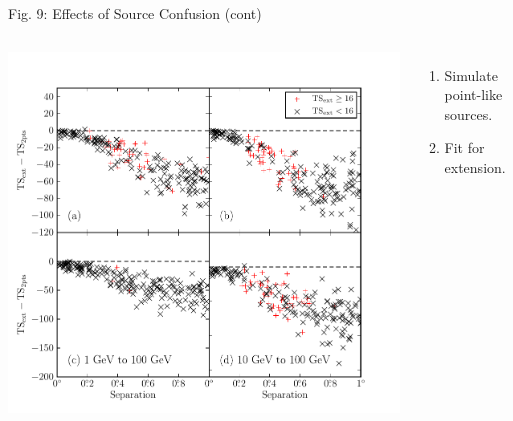 \documentclass[12pt]{beamer}
\begin{document}
\begin{frame}{Fig. 9: Effects of Source Confusion (cont)}

  \begin{columns}

    \includegraphics[scale=0.50]{plots/confusion_2pts_plot_color.pdf}
    \begin{enumerate}
      \item Simulate point-like sources. 
      \item Fit for extension.
    \end{enumerate}
  \end{columns}
\end{frame}
\end{document}
